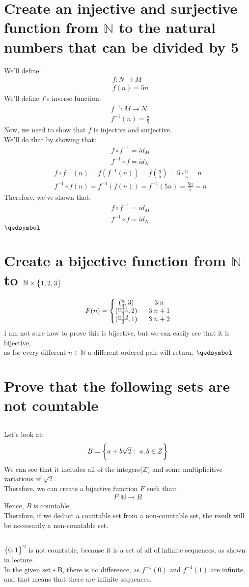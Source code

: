\documentclass[a4paper, 12pt]{article}
\newcommand{\sub}[1]{\subsection{\underline{#1}}}
\newcommand{\N}{\ensuremath{\mathbb{N}}}
\newcommand{\eq}[1]{\begin{align*}#1\end{align*}}
\newcommand{\set}[1]{\big{\{} #1 \big{\}}}
\newcommand{\bigset}[1]{\bigg{\{} #1 \bigg{\}}}
\renewcommand{\qed}{\hfill\(\qedsymbol\)}
\begin{document}
\begin{titlepage}
    
\end{titlepage}

\section{Create an injective and surjective function from $\N$ to the natural numbers that can be divided by 5}
We'll define:
\eq{
    &f:N\longrightarrow{M}\\
    &f(n)=5n
}
We'll define $f$'s inverse function:
\eq{
    &f^{-1}:M\longrightarrow{N}\\
    &f^{-1}(n)=\frac{n}{5}
}
Now, we need to show that $f$ is injective and surjective.\\
We'll do that by showing that:
\eq{
    &f\circ{f^{-1}}=id_M\\
    &f^{-1}\circ{f}=id_N
}
\eq{
    &f\circ{f^{-1}}(n)=f(f^{-1}(n))=f(\frac{n}{5})=5\cdot\frac{n}{5}=n\\
    &f^{-1}\circ{f}(n)=f^{-1}(f(n))=f^{-1}(5n)=\frac{5n}{5}=n
}
Therefore, we've shown that:
\eq{
    &f\circ{f^{-1}}=id_M\\
    &f^{-1}\circ{f}=id_N
}
\qed

\section{Create a bijective function from $\N$ to $\N\times\set{1,2,3}$}
\eq{
    F(n)=\bigg{\{
        \begin{matrix}
            (\frac{n}{3},3)~~& 3|n\\
            (\frac{n+1}{3},2)~~& 3|n+1\\
            (\frac{n+2}{3},1)~~& 3|n+2
        \end{matrix}
    }
}
I am not sure how to prove this is bijective, but we can easily see that it is bijective,\\
as for every different $n\in\N$ a different ordered-pair will return.
\qed\pagebreak

\section{Prove that the following sets are not countable}
\sub{}
Let's look at:
\eq{
    B=\bigset{a+b\sqrt{2}:~a,b\in{Z}}
}
We can see that it includes all of the integers($\mathbb{Z}$) and some multiplicitive variations of $\sqrt{2}$.\\
Therefore, we can create a bijective function $F$ such that:
\eq{
    F: \N\longrightarrow{B}
}
Hence, \textit{B} is countable.\\
Therefore, if we deduct a countable set from a non-countable set, the result will be necessarily a non-countable set.
\sub{}
$\set{0,1}^{\N}$ is not countable, because it is a set of all of infinite sequences, as shown in lecture.\\
In the given set - B, there is no difference, as $f^{-1}({0})$ and $f^{-1}({1})$ are infinite, and that means that there are infinite sequences.
\end{document}
